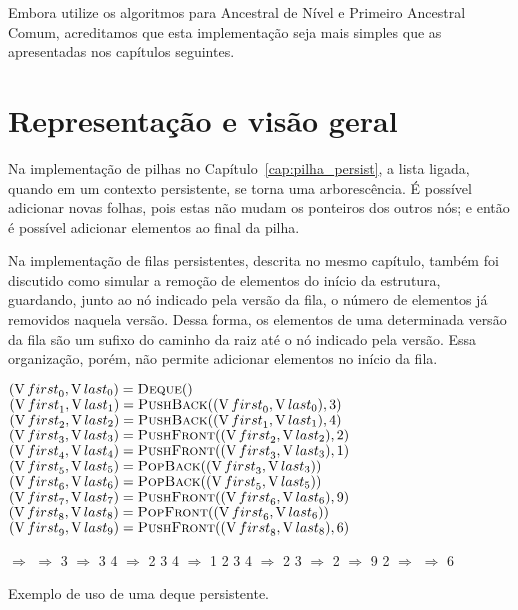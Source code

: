 \documentclass[../../main.tex]{subfiles}
\begin{document}
Embora utilize os algoritmos para Ancestral de Nível e Primeiro Ancestral Comum, acreditamos que esta implementação seja mais simples que as apresentadas nos capítulos seguintes.

\section{Representação e visão geral}

Na implementação de pilhas no Capítulo~\ref{cap:pilha_persist}, a lista ligada, quando em um contexto persistente, se torna uma arborescência. É possível adicionar novas folhas, pois estas não mudam os ponteiros dos outros nós; e então é possível adicionar elementos ao final da pilha.

Na implementação de filas persistentes, descrita no mesmo capítulo, também foi discutido como simular a remoção de elementos do início da estrutura, guardando, junto ao nó indicado pela versão da fila, o número de elementos já removidos naquela versão. Dessa forma, os elementos de uma determinada versão da fila são um sufixo do caminho da raiz até o nó indicado pela versão. Essa organização, porém, não permite adicionar elementos no início da fila.

\begin{example}[t]
\centering

\begin{subalgorithm}{0.55\textwidth}
\begin{algorithmic}

\State $(\V{first}_0, \V{last}_0) = \Call{Deque}{\null}$
\State $(\V{first}_1, \V{last}_1) = \Call{PushBack}{(\V{first}_0,\V{last}_0), 3}$
\State $(\V{first}_2, \V{last}_2) = \Call{PushBack}{(\V{first}_1,\V{last}_1), 4}$
\State $(\V{first}_3, \V{last}_3) = \Call{PushFront}{(\V{first}_2,\V{last}_2), 2}$
\State $(\V{first}_4, \V{last}_4) = \Call{PushFront}{(\V{first}_3,\V{last}_3), 1}$
\State $(\V{first}_5, \V{last}_5) = \Call{PopBack}{(\V{first}_3,\V{last}_3)}$
\State $(\V{first}_6, \V{last}_6) = \Call{PopBack}{(\V{first}_5,\V{last}_5)}$
\State $(\V{first}_7, \V{last}_7) = \Call{PushFront}{(\V{first}_6,\V{last}_6), 9}$
\State $(\V{first}_8, \V{last}_8) = \Call{PopFront}{(\V{first}_6,\V{last}_6)}$
\State $(\V{first}_9, \V{last}_9) = \Call{PushFront}{(\V{first}_8,\V{last}_8), 6}$

\end{algorithmic}
\end{subalgorithm} \vrule
\begin{subalgorithm}{0.4\textwidth}
\begin{algorithmic}

\State $\Rightarrow$
\State $\Rightarrow$ 3
\State $\Rightarrow$ 3 4
\State $\Rightarrow$ 2 3 4
\State $\Rightarrow$ 1 2 3 4
\State $\Rightarrow$ 2 3
\State $\Rightarrow$ 2
\State $\Rightarrow$ 9 2
\State $\Rightarrow$
\State $\Rightarrow$ 6

\end{algorithmic}
\end{subalgorithm}
\caption{Exemplo de uso de uma deque persistente.} \label{ex:deque}
\end{example}
\end{document}
